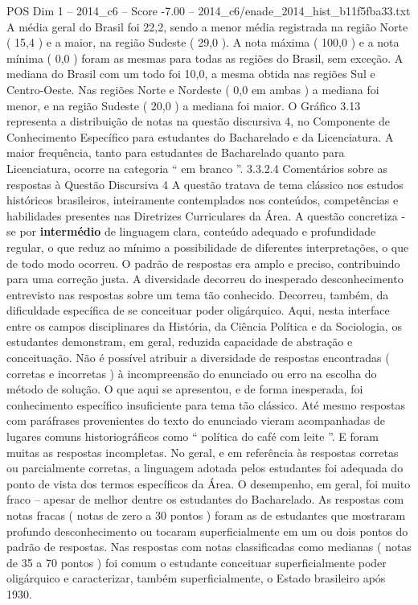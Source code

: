 \begin{textsample}{POS Dim 1 – 2014\_c6 – Score -7.00 – 2014\_c6/enade\_2014\_hist\_b11f5fba33.txt}
A média geral do Brasil foi 22,2, sendo a menor média registrada na região Norte ( 15,4 ) e a maior, na região Sudeste ( 29,0 ).
A nota máxima ( 100,0 ) e a nota mínima ( 0,0 ) foram as mesmas para todas as regiões do Brasil, sem exceção.
A mediana do Brasil com um todo foi 10,0, a mesma obtida nas regiões Sul e Centro-Oeste.
Nas regiões Norte e Nordeste ( 0,0 em ambas ) a mediana foi menor, e na região Sudeste ( 20,0 ) a mediana foi maior.
O Gráfico 3.13 representa a distribuição de notas na questão discursiva 4, no Componente de Conhecimento Específico para estudantes do Bacharelado e da Licenciatura.
A maior frequência, tanto para estudantes de Bacharelado quanto para Licenciatura, ocorre na categoria “ em branco ”. 3.3.2.4 Comentários sobre as respostas à Questão Discursiva 4 A questão tratava de tema clássico nos estudos históricos brasileiros, inteiramente contemplados nos conteúdos, competências e habilidades presentes nas Diretrizes Curriculares da Área.
A questão concretiza -se por \textbf{intermédio} de linguagem clara, conteúdo adequado e profundidade regular, o que reduz ao mínimo a possibilidade de diferentes interpretações, o que de todo modo ocorreu.
O padrão de respostas era amplo e preciso, contribuindo para uma correção justa.
A diversidade decorreu do inesperado desconhecimento entrevisto nas respostas sobre um tema tão conhecido.
Decorreu, também, da dificuldade específica de se conceituar poder oligárquico.
Aqui, nesta interface entre os campos disciplinares da História, da Ciência Política e da Sociologia, os estudantes demonstram, em geral, reduzida capacidade de abstração e conceituação.
Não é possível atribuir a diversidade de respostas encontradas ( corretas e incorretas ) à incompreensão do enunciado ou erro na escolha do método de solução.
O que aqui se apresentou, e de forma inesperada, foi conhecimento específico insuficiente para tema tão clássico.
Até mesmo respostas com paráfrases provenientes do texto do enunciado vieram acompanhadas de lugares comuns historiográficos como “ política do café com leite ”.
E foram muitas as respostas incompletas.
No geral, e em referência às respostas corretas ou parcialmente corretas, a linguagem adotada pelos estudantes foi adequada do ponto de vista dos termos específicos da Área.
O desempenho, em geral, foi muito fraco – apesar de melhor dentre os estudantes do Bacharelado.
As respostas com notas fracas ( notas de zero a 30 pontos ) foram as de estudantes que mostraram profundo desconhecimento ou tocaram superficialmente em um ou dois pontos do padrão de respostas.
Nas respostas com notas classificadas como medianas ( notas de 35 a 70 pontos ) foi comum o estudante conceituar superficialmente poder oligárquico e caracterizar, também superficialmente, o Estado brasileiro após 1930.

\end{textsample}
